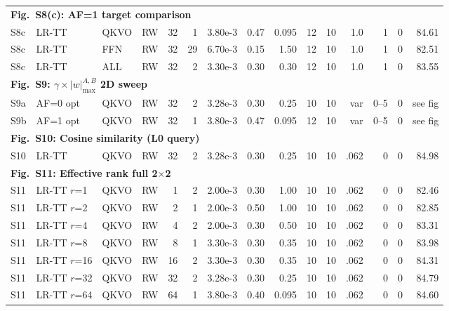 \documentclass[AMA,LATO1COL]{WileyNJDv5}
\newcommand{\SIEndSection}{\FloatBarrier\clearpage}
\begin{document}
{\begin{longtable}{@{}l l l l r r r r r r r r r r r@{}}
\multicolumn{15}{l}{\cellcolor{HeadGray}\textbf{Fig.~S8(c): AF=1 target comparison}} \\
S8c & LR-TT & QKVO & RW & 32 & 1 & 3.80e-3 & 0.47 & 0.095 & 12 & 10 & 1.0 & 1 & 0 & 84.61 \\
S8c & LR-TT & FFN & RW & 32 & 29 & 6.70e-3 & 0.15 & 1.50 & 12 & 10 & 1.0 & 1 & 0 & 82.51 \\
S8c & LR-TT & ALL & RW & 32 & 2 & 3.30e-3 & 0.30 & 0.30 & 12 & 10 & 1.0 & 1 & 0 & 83.55 \\
\midrule

\multicolumn{15}{l}{\cellcolor{HeadGray}\textbf{Fig.~S9: $\gamma \times |w|_{\max}^{A,B}$ 2D sweep}} \\
S9a & AF=0 opt & QKVO & RW & 32 & 2 & 3.28e-3 & 0.30 & 0.25 & 10 & 10 & var & 0--5 & 0 & see fig \\
S9b & AF=1 opt & QKVO & RW & 32 & 1 & 3.80e-3 & 0.47 & 0.095 & 12 & 10 & var & 0--5 & 0 & see fig \\
\midrule

\multicolumn{15}{l}{\cellcolor{HeadGray}\textbf{Fig.~S10: Cosine similarity (L0 query)}} \\
S10 & LR-TT & QKVO & RW & 32 & 2 & 3.28e-3 & 0.30 & 0.25 & 10 & 10 & .062 & 0 & 0 & 84.98 \\
\midrule

\multicolumn{15}{l}{\cellcolor{HeadGray}\textbf{Fig.~S11: Effective rank full 2$\times$2}} \\
S11 & LR-TT $r$=1 & QKVO & RW & 1 & 2 & 2.00e-3 & 0.30 & 1.00 & 10 & 10 & .062 & 0 & 0 & 82.46 \\
S11 & LR-TT $r$=2 & QKVO & RW & 2 & 1 & 2.00e-3 & 0.50 & 1.00 & 10 & 10 & .062 & 0 & 0 & 82.85 \\
S11 & LR-TT $r$=4 & QKVO & RW & 4 & 2 & 2.00e-3 & 0.30 & 0.50 & 10 & 10 & .062 & 0 & 0 & 83.31 \\
S11 & LR-TT $r$=8 & QKVO & RW & 8 & 1 & 3.30e-3 & 0.30 & 0.35 & 10 & 10 & .062 & 0 & 0 & 83.98 \\
S11 & LR-TT $r$=16 & QKVO & RW & 16 & 2 & 3.30e-3 & 0.30 & 0.35 & 10 & 10 & .062 & 0 & 0 & 84.31 \\
S11 & LR-TT $r$=32 & QKVO & RW & 32 & 2 & 3.28e-3 & 0.30 & 0.25 & 10 & 10 & .062 & 0 & 0 & 84.79 \\
S11 & LR-TT $r$=64 & QKVO & RW & 64 & 1 & 3.80e-3 & 0.40 & 0.095 & 10 & 10 & .062 & 0 & 0 & 84.60 \\

\end{longtable}
}

\SIEndSection
\renewcommand{\arraystretch}{1.10}


\end{document}
